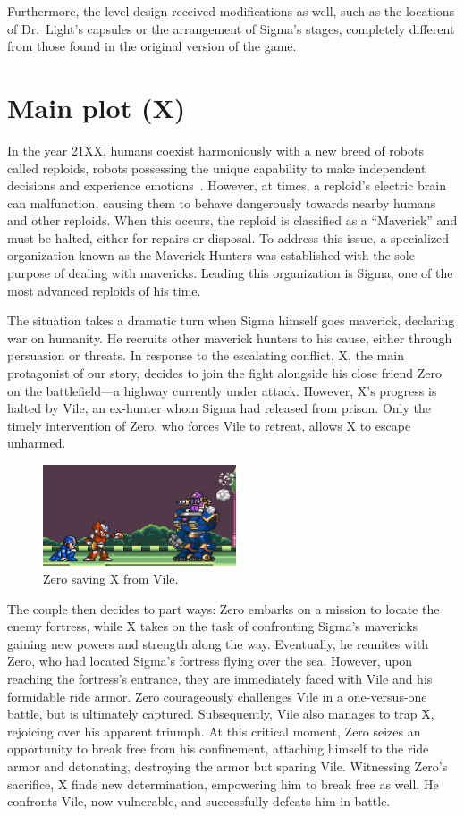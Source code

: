 Furthermore, the level design received modifications as well, such as the locations of Dr.~Light's capsules or the arrangement of Sigma's stages, completely different from those found in the original version of the game. 

\section[Main plot]{Main plot (X)}
In the year 21XX, humans coexist harmoniously with a new breed of robots called reploids, robots possessing the unique capability to make independent decisions and experience emotions~\cite{Xcoll1:Manual_X1}. However, at times, a reploid's electric brain can malfunction, causing them to behave dangerously towards nearby humans and other reploids. When this occurs, the reploid is classified as a ``Maverick'' and must be halted, either for repairs or disposal. To address this issue, a specialized organization known as the Maverick Hunters was established with the sole purpose of dealing with mavericks. Leading this organization is Sigma, one of the most advanced reploids of his time.

The situation takes a dramatic turn when Sigma himself goes maverick, declaring war on humanity. He recruits other maverick hunters to his cause, either through persuasion or threats. In response to the escalating conflict, X, the main protagonist of our story, decides to join the fight alongside his close friend Zero on the battlefield—a highway currently under attack. However, X's progress is halted by Vile, an ex-hunter whom Sigma had released from prison. Only the timely intervention of Zero, who forces Vile to retreat, allows X to escape unharmed.

\begin{figure}[htp]
	\centering
	\includegraphics[height=3cm]{figures/X1/Highway_end.jpg}
	\caption{Zero saving X from Vile.}
\end{figure}

The couple then decides to part ways: Zero embarks on a mission to locate the enemy fortress, while X takes on the task of confronting Sigma's mavericks gaining new powers and strength along the way. Eventually, he reunites with Zero, who had located Sigma's fortress flying over the sea. However, upon reaching the fortress's entrance, they are immediately faced with Vile and his formidable ride armor. Zero courageously challenges Vile in a one-versus-one battle, but is ultimately captured. Subsequently, Vile also manages to trap X, rejoicing over his apparent triumph. At this critical moment, Zero seizes an opportunity to break free from his confinement, attaching himself to the ride armor and detonating, destroying the armor but sparing Vile. Witnessing Zero's sacrifice, X finds new determination, empowering him to break free as well. He confronts Vile, now vulnerable, and successfully defeats him in battle.

